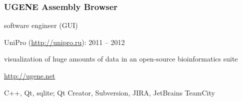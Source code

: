 \documentclass[a4paper, 12pt]{article}
\begin{document}
  \subsubsection*{UGENE Assembly Browser}
  \begin{description}[labelindent=1em]
    \item[Position:] software engineer (GUI)
    \item[Company:] UniPro (\url{http://unipro.ru}): 2011 -- 2012
    \item[Description:] visualization of huge amounts of data in an open-source bioinformatics suite
    \item[Website:] \url{http://ugene.net}
    \item[Technologies and tools:] C++, Qt, sqlite; Qt Creator, Subversion, JIRA, JetBrains TeamCity
  \end{description}
\end{document}
